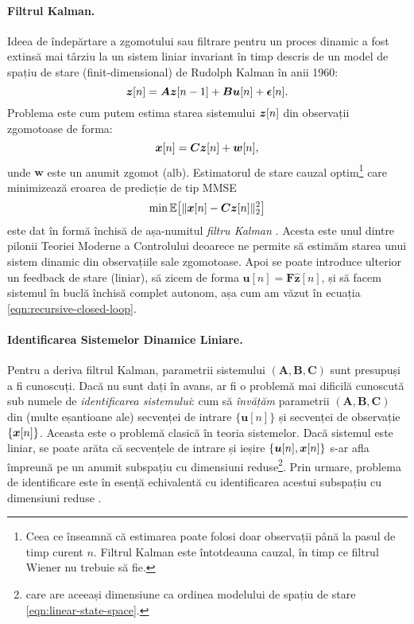 \documentclass[../../book-main_ro.tex]{subfiles}
\begin{document}
\paragraph{Filtrul Kalman.}
Ideea de îndepărtare a zgomotului sau filtrare pentru un proces dinamic a fost extinsă mai târziu la un sistem liniar invariant în timp descris de un model de spațiu de stare (finit-dimensional) de Rudolph Kalman în anii 1960:
\begin{equation}
    \bm{z}[n] = \boldsymbol{A} \bm{z}[n-1] + \boldsymbol{B}\boldsymbol{u}[n] + \boldsymbol{\epsilon}[n].
    \label{eqn:linear-state-space}
\end{equation}
Problema este cum putem estima starea sistemului $\bm{z}[n]$ din observații zgomotoase de forma: \begin{equation}\bm{x}[n] = \boldsymbol{C} \bm{z}[n] + \boldsymbol{w}[n],
\label{eqn:Kalman-model}
\end{equation}
unde $\boldsymbol{w}$ este un anumit zgomot (alb). Estimatorul de stare cauzal optim\footnote{Ceea ce înseamnă că estimarea poate folosi doar observații până la pasul de timp curent $n$. Filtrul Kalman este întotdeauna cauzal, în timp ce filtrul Wiener nu trebuie să fie.} care minimizează eroarea de predicție de tip MMSE
\begin{equation}
    \min \mathbb{E}\big[ \|\bm{x}[n] - \boldsymbol{C}\bm{z}[n]\|_2^2\big]
\end{equation}
este dat în formă închisă de așa-numitul {\em filtru Kalman} \cite{kalman1960new}. Acesta este unul dintre pilonii Teoriei Moderne a Controlului deoarece ne permite să estimăm starea unui sistem dinamic din observațiile sale zgomotoase. Apoi se poate introduce ulterior un feedback de stare (liniar), să zicem de forma $\boldsymbol{u}[n] = \boldsymbol{F} \hat{\boldsymbol{z}}[n]$, și să facem sistemul în buclă închisă complet autonom, așa cum am văzut în ecuația \eqref{eqn:recursive-closed-loop}.

\paragraph{Identificarea Sistemelor Dinamice Liniare.}
Pentru a deriva filtrul Kalman, parametrii sistemului $(\boldsymbol{A}, \boldsymbol{B}, \boldsymbol{C})$ sunt presupuși a fi cunoscuți. Dacă nu sunt dați în avans, ar fi o problemă mai dificilă cunoscută sub numele de {\em identificarea sistemului}: cum să {\em învățăm} parametrii $(\boldsymbol{A}, \boldsymbol{B}, \boldsymbol{C})$ din (multe eșantioane ale) secvenței de intrare $\{\boldsymbol{u}[n]\}$ și secvenței de observație $\{\bm{x}[n]\}$. Aceasta este o problemă clasică în teoria sistemelor. Dacă sistemul este liniar, se poate arăta că secvențele de intrare și ieșire $\{\boldsymbol{u}[n], \bm{x}[n]\}$ s-ar afla împreună pe un anumit subspațiu cu dimensiuni reduse\footnote{care are aceeași dimensiune ca ordinea modelului de spațiu de stare \eqref{eqn:linear-state-space}.}. Prin urmare, problema de identificare este în esență echivalentă cu identificarea acestui subspațiu cu dimensiuni reduse \cite{OverscheeP1996,Liu-2009-CDC,Liu-2010-SIAM}.
\end{document}
